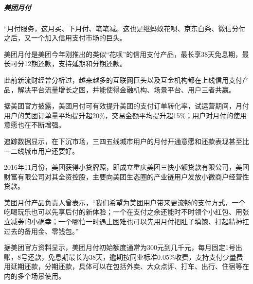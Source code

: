 \documentclass[letterpaper,11pt,english]{sphinxmanual}
\begin{document}
\subparagraph{美团月付}
\label{\detokenize{chapter_company/meituan:id13}}
“月付服务，这月买、下月付、笔笔减。这也是继蚂蚁花呗、京东白条、微信分付之后，又一个加入信用支付市场的巨头。%
\begin{footnote}[916]\sphinxAtStartFootnote
{}
%
\end{footnote}

美团月付是美团今年刚推出的类似“花呗”的信用支付产品，最长享38天免息期，最长可分12期还款，支持延期和分期还款。

此前新流财经曾分析过，越来越多的互联网巨头以及互金机构都在上线信用支付产品，解决平台流量增长之困，并能使得金融机构、场景平台、用户三者共赢。

据美团官方披露，美团月付可有效提升美团的支付订单转化率，试运营期间，月付用户的美团订单量平均提升超20\%，交易金额平均提升超15\%；用户对月付的使用意愿也在不断增强。

追踪数据显示，在下沉市场，三四五线城市用户的月付开通意愿和还款表现甚至比一二线城市用户还要好。%
\begin{footnote}[917]\sphinxAtStartFootnote
{}
%
\end{footnote}

2016年11月份，美团获得小贷牌照，即成立重庆美团三快小额贷款有限公司，美团财富有限公司对其全资控股，主要向美团生态圈的产业链用户发放小微商户经营性贷款。%
\begin{footnote}[918]\sphinxAtStartFootnote
{}
%
\end{footnote}

美团月付产品负责人曾表示，“我们希望为美团用户带来更流畅的支付方式，一个吃喝玩乐也可以先享后付的新体验；一个在支付之余还能时不时领个小红包、用张立减券的小确幸；一个哪怕一时遇上困难也可以先用月付把肚子填饱、打起精神扛过去的备用金、零钱包。”

据美团官方资料显示，美团月付初始额度通常为300元到几千元，每月固定1号出账，8号还款，免息期最长为38天，逾期按同业标准0.05\%收费，支持支付少量费用延期还款，分期还款，具体可以在包括外卖、大众点评、打车、出行、住宿等在内的多个场景使用。%
\begin{footnote}[919]\sphinxAtStartFootnote
{}
%
\end{footnote}
\end{document}

